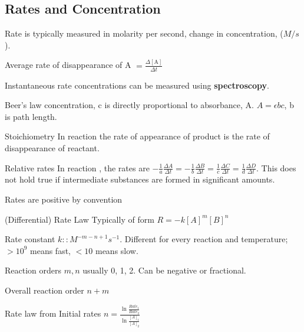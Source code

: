 \begin{mdframed}\subsection{Rates and Concentration}
\begin{multicols}{2}
    Rate is typically measured in molarity per second, change in
    concentration, ($M/s$).
\begin{compactdesc}
    \item[Average rate] of disappearance of A $=
        \frac{\Delta [\text{A}]}{\Delta t}$
    \item[Instantaneous rate] concentrations can be measured using \textbf{spectroscopy}.
    \item[Beer's law] concentration, c is directly proportional to absorbance, A.
        $A = \epsilon b c$, b is path length.
    \item[Stoichiometry] In reaction  the rate of appearance of product
        is the rate of disappearance of reactant.
    \item[Relative rates] In reaction , the rates are
        $   -\frac{1}{a}\frac{\Delta A}{\Delta t}
          = -\frac{1}{b}\frac{\Delta B}{\Delta t}
          =  \frac{1}{c}\frac{\Delta C}{\Delta t}
          =  \frac{1}{d}\frac{\Delta D}{\Delta t}
        $. This does not hold true if intermediate substances are formed in
        significant amounts.
    \item[Rates are positive] by convention

    \item[(Differential) Rate Law] Typically of form $R = -k[A]^m[B]^n$
    \item[Rate constant] $k :: M^{-m - n + 1}s^{-1}$. Different for every reaction
        and temperature; $>10^9$ means fast, $<10$ means slow.
    \item[Reaction orders]
        $m, n$ usually 0, 1, 2. Can be negative or fractional.
    \item[Overall reaction order] $n + m$
    \item[Rate law from Initial rates]
        \(
            n = \frac {\ln \frac {Rate_1} {Rate_2} } {\ln \frac {[A]_1} {[A]_2} }
        \)
\end{compactdesc}
\end{multicols}
\end{mdframed}



